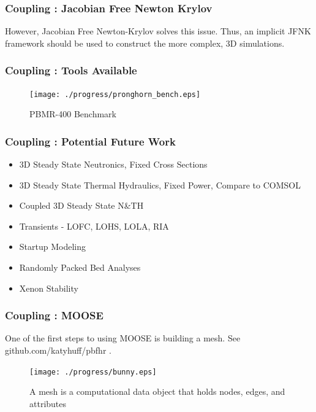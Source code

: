 \begin{frame}[fragile]
  \frametitle{Coupling : Jacobian Free Newton Krylov}
However, Jacobian Free Newton-Krylov solves this issue. Thus, an implicit JFNK 
framework should be used to construct the more complex, 3D simulations. 

\end{frame}

\begin{frame}[fragile]
  \frametitle{Coupling : Tools Available}
  \begin{figure}[htbp!]
    \begin{center}
      \texttt{[image: ./progress/pronghorn\_bench.eps]}
    \end{center}
    \caption{PBMR-400 Benchmark}
    \label{fig:pbmr400}
  \end{figure}
\end{frame}

\begin{frame}[fragile]
  \frametitle{Coupling : Potential Future Work}
    \begin{itemize}
    \item 3D Steady State Neutronics, Fixed Cross Sections 
    \item 3D Steady State Thermal Hydraulics, Fixed Power, Compare to COMSOL 
    \item Coupled 3D Steady State N\&TH
    \item Transients - LOFC, LOHS, LOLA, RIA
    \item Startup Modeling
    \item Randomly Packed Bed Analyses
    \item Xenon Stability
    \end{itemize}
\end{frame}

\begin{frame}[fragile]
  \frametitle{Coupling : MOOSE}
  One of the first steps to using MOOSE is building a mesh. 
  See github.com/katyhuff/pbfhr .

  \begin{figure}[htbp!]
    \begin{center}
      \texttt{[image: ./progress/bunny.eps]}
    \end{center}
    \caption{A mesh is a computational data object that holds nodes, edges, and 
    attributes}
    \label{fig:radau_stability}
  \end{figure}

\end{frame}

